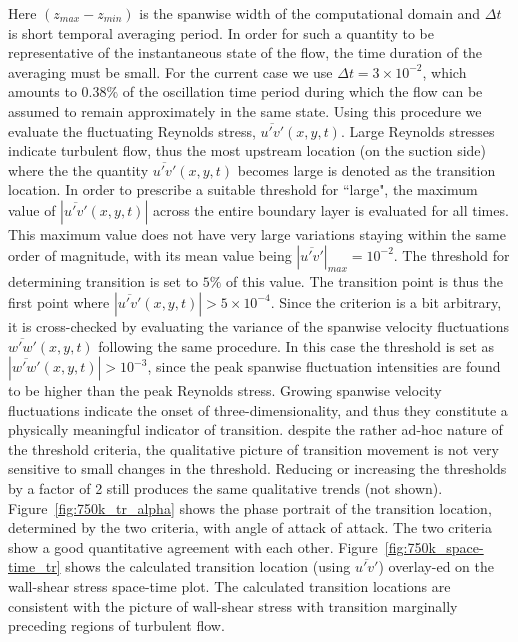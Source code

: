 Here $(z_{max} - z_{min})$ is the spanwise width of the computational domain and $\Delta t$ is short temporal averaging period. In order for such a quantity to be representative of the instantaneous state of the flow, the time duration of the averaging must be small. For the current case we use $\Delta t=3\times10^{-2}$, which amounts to $0.38\%$ of the oscillation time period during which the flow can be assumed to remain approximately in the same state. Using this procedure we evaluate the fluctuating Reynolds stress, $\overline{u'v'}(x,y,t)$. Large Reynolds stresses indicate turbulent flow, thus the most upstream location (on the suction side) where the the quantity $\overline{u'v'}(x,y,t)$ becomes large is denoted as the transition location. In order to prescribe a suitable threshold for ``large", the maximum value of $|\overline{u'v'}(x,y,t)|$ across the entire boundary layer is evaluated for all times. This maximum value does not have very large variations staying within the same order of magnitude, with its mean value being $|\overline{u'v'}|_{max}=10^{-2}$. The threshold for determining transition is set to $5\%$ of this value. The transition point is thus the first point where $|\overline{u'v'}(x,y,t)|>5\times10^{-4}$. Since the criterion is a bit arbitrary, it is cross-checked by evaluating the variance of the spanwise velocity fluctuations $\overline{w'w'}(x,y,t)$ following the same procedure. In this case the threshold is set as $|\overline{w'w'}(x,y,t)|>10^{-3}$, since the peak spanwise fluctuation intensities are found to be higher than the peak Reynolds stress. Growing spanwise velocity fluctuations indicate the onset of three-dimensionality, and thus they constitute a physically meaningful indicator of transition. despite the rather ad-hoc nature of the threshold criteria, the qualitative picture of transition movement is not very sensitive to small changes in the threshold. Reducing or increasing the thresholds by a factor of 2 still produces the same qualitative trends (not shown). Figure~\ref{fig:750k_tr_alpha} shows the phase portrait of the transition location, determined by the two criteria, with angle of attack of attack. The two criteria show a good quantitative agreement with each other. Figure~\ref{fig:750k_space-time_tr} shows the calculated transition location (using $\overline{u'v'}$) overlay-ed on the wall-shear stress space-time plot. The calculated transition locations are consistent with the picture of wall-shear stress with transition marginally preceding regions of turbulent flow.

